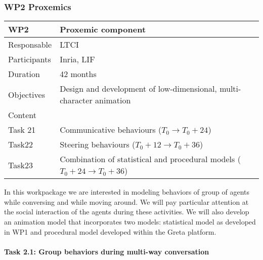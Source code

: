 
\subsubsection{WP2 Proxemics}


\begin{center}
\begin{tabular}{|l|l|}\hline
WP2 &  Proxemic component \\\hline
Responsable &  LTCI  \\\hline
Participants &  Inria, LIF\\\hline
Duration  &   42 months \\\hline
Objectives &  Design and development of low-dimensional, multi-character  animation \\\hline
Content &  \\\hline
Task 21 & Communicative behaviours   ($T_0 \rightarrow  T_0+24$)\\\hline
Task22 &  Steering behaviours  ($T_0+12 \rightarrow  T_0+36$) \\\hline
Task23 &  Combination of statistical and procedural models    ($T_0 +24 \rightarrow  T_0+36$) \\\hline
\end{tabular}
\end{center}

In this workpackage we are interested in modeling behaviors of group of agents while conversing and while moving around. We will pay particular attention at the social interaction of the agents during these activities. We will also develop an animation model that incorporates two models: statistical model as developed in WP1 and procedural model developed within the Greta platform.


\paragraph{Task 2.1: Group behaviors during multi-way conversation}

